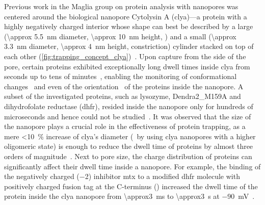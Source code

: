 Previous work in the Maglia group on protein analysis with nanopores was centered around the biological
nanopore Cytolysin A (\gls{clya})---a protein with a highly negatively charged interior whose shape can best
be described by a large (\SI{\approx 5.5}{\nm} diameter, \SI{\approx 10}{\nm} height, \cisi{} \lumen{}) and a
small (\SI{\approx 3.3}{\nm} diameter, \SI{\approx 4}{\nm} height, \transi{} constriction) cylinder stacked on
top of each other (\cref{fig:trapping_concept_clya})~\cite{Soskine-2012,Soskine-2013}. Upon capture from the
\cisi{} side of the pore, certain proteins exhibited exceptionally long dwell times inside \gls{clya} from
seconds up to tens of
minutes~\cite{Soskine-2012,Soskine-2013,Soskine-Biesemans-2015,Wloka-2017,VanMeervelt-2017,Galenkamp-2018},
enabling the monitoring of conformational changes~\cite{VanMeervelt-2014, Galenkamp-2018,Biesemans-2015} and
even of the orientation~\cite{VanMeervelt-2014} of the proteins inside the nanopore. A subset of the
investigated proteins, such as lysozyme, Dendra2\_M159A and dihydrofolate reductase (\gls{dhfr}), resided
inside the nanopore \lumen{} only for hundreds of microseconds and hence could not be
studied~\cite{Soskine-2012,Soskine-Biesemans-2015}. It was observed that the size of the nanopore plays a
crucial role in the effectiveness of protein trapping, as a mere \SI{<10}{\percent} increase of \gls{clya}'s
diameter (\ie~by using \gls{clya} nanopores with a higher oligomeric state) is enough to reduce the dwell time
of proteins by almost three orders of magnitude~\cite{Soskine-2013}. Next to pore size, the charge
distribution of proteins can significantly affect their dwell time inside a nanopore. For example, the binding
of the negatively charged (\SI{-2}{\ec}) inhibitor \gls{mtx} to a modified \gls{dhfr} molecule with positively
charged fusion tag at the C-terminus (\DHFRt{}) increased the dwell time of the protein inside the \gls{clya}
nanopore from \SI{\approx3}{\ms} to \SI{\approx3}{\second} at \SI{-90}{\mV}~\cite{Soskine-Biesemans-2015}.

